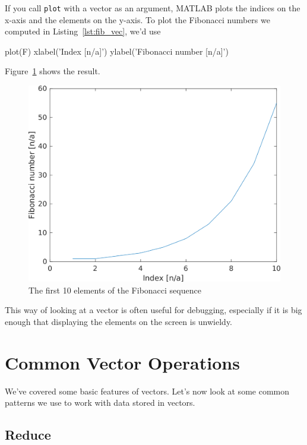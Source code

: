 
If you call \lstinline{plot} with a vector as an argument,
MATLAB plots the indices on the x-axis and the elements on the
y-axis.  To plot the Fibonacci numbers we computed in Listing~\ref{lst:fib_vec}, we'd use

\begin{code}
plot(F)
xlabel('Index [n/a]')
ylabel('Fibonacci number [n/a]')
\end{code}

Figure~\ref{fig:fibonacci} shows the result.

\begin{figure}[h]
\centerline{\includegraphics[scale=0.7]{images/figure04_fib}}
\caption{The first 10 elements of the Fibonacci sequence}
\label{fig:fibonacci}
\end{figure}

This way of looking at a vector is often useful for debugging, especially
if it is big enough that displaying the elements on
the screen is unwieldy.


\section{Common Vector Operations}

We've covered some basic features of vectors. Let's now look at some common patterns we use to work with data stored in vectors.

\subsection{Reduce}
\label{reduce}

